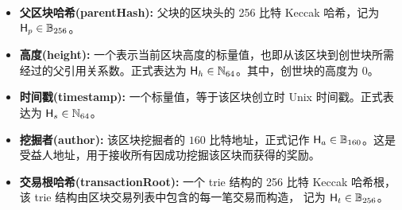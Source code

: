 \begin{itemize}[nosep]
	\item {\bf 父区块哈希(parentHash):} 父块的区块头的 256 比特 Keccak 哈希，记为
	$\textsf{H}_p\in\mathbb{B}_{256}$。
	
	\item {\bf 高度(height):} 一个表示当前区块高度的标量值，也即从该区块到创世块所需经过的父引用关系数。正式表达为 $\textsf{H}_h\in \mathbb{N}_{64}$。其中，创世块的高度为 $0$。
	
	\item {\bf 时间戳(timestamp):} 一个标量值，等于该区块创立时 Unix 时间戳。正式表达为 $\textsf{H}_s \in \mathbb{N}_{64}$。

	\item {\bf 挖掘者(author):} 该区块挖掘者的 $160$ 比特地址，正式记作 $\textsf{H}_a \in \mathbb{B}_{160}$。这是受益人地址，用于接收所有因成功挖掘该区块而获得的奖励。

	\item {\bf 交易根哈希(transactionRoot):} 一个 trie 结构的 256 比特 Keccak 哈希根，该 trie 结构由区块交易列表中包含的每一笔交易而构造， 记为 $\textsf{H}_t\in\mathbb{B}_{256}$。


\end{itemize}
